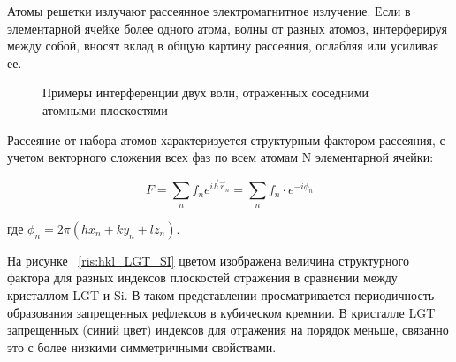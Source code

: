 \label{sec:structure_factor}
Атомы решетки излучают рассеянное электромагнитное излучение.
Если в элементарной ячейке более одного атома, волны от разных атомов,
 интерферируя между собой, вносят вклад в общую картину рассеяния,
 ослабляя или усиливая ее.

 \begin{figure}[H]
   \centering
   \hfill
   \caption{Примеры интерференции двух волн, отраженных соседними атомными плоскостями}
   \label{ris:interference_by_plate}
 \end{figure}

Рассеяние от набора атомов характеризуется структурным фактором рассеяния,
 с учетом векторного сложения всех фаз по всем атомам N элементарной ячейки:

 \begin{equation}
   F = \sum_{n} f_n e^{ i\vec{h}\vec{r}_n} =   \sum_{n} f_n \cdot e^{-i\phi_n}
  \end{equation}

  где $\phi_n = 2 \pi (hx_n+ky_n+lz_n)$.


На рисунке ~\ref{ris:hkl_LGT_SI} цветом изображена величина структурного фактора для разных
 индексов плоскостей отражения в сравнении между кристаллом LGT и Si.
 В таком представлении просматривается периодичность образования запрещенных
 рефлексов в кубическом кремнии. В кристалле LGT запрещенных (синий цвет)
  индексов для отражения на порядок меньше, связанно это с более низкими
  симметричными свойствами.

